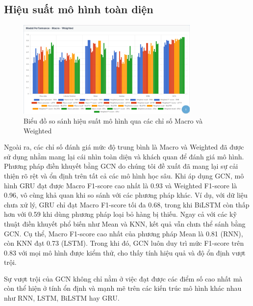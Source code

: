 \subsection{Hiệu suất mô hình toàn diện}
\begin{figure}[H]
    \centering
    \includegraphics[width = 0.8\textwidth]{imgs/demo-modelperf.png}
    \caption{Biểu đồ so sánh hiệu suất mô hình qua các chỉ số Macro và Weighted}
    \label{fig:demo-modelperf}
\end{figure}

Ngoài ra, các chỉ số đánh giá mức độ trung bình là Macro và Weighted đã được sử dụng nhằm mang lại cái nhìn toàn diện và khách quan để đánh giá mô hình. Phương pháp điền khuyết bằng GCN do chúng tôi đề xuất đã mang lại sự cải thiện rõ rệt và ổn định trên tất cả các mô hình học sâu. Khi áp dụng GCN, mô hình GRU đạt được Macro F1-score cao nhất là 0.93 và Weighted F1-score là 0.96, vô cùng khả quan khi so sánh với các phương pháp khác. Ví dụ, với dữ liệu chưa xử lý, GRU chỉ đạt Macro F1-score tối đa 0.68, trong khi BiLSTM còn thấp hơn với 0.59 khi dùng phương pháp loại bỏ hàng bị thiếu. Ngay cả với các kỹ thuật điền khuyết phổ biến như Mean và KNN, kết quả vẫn chưa thể sánh bằng GCN. Cụ thể, Macro F1-score cao nhất của phương pháp Mean là 0.81 (RNN), còn KNN đạt 0.73 (LSTM). Trong khi đó, GCN luôn duy trì mức F1-score trên 0.83 với mọi mô hình được kiểm thử, cho thấy tính hiệu quả và độ ổn định vượt trội.

Sự vượt trội của GCN không chỉ nằm ở việc đạt được các điểm số cao nhất mà còn thể hiện ở tính ổn định và mạnh mẽ trên các kiến trúc mô hình khác nhau như RNN, LSTM, BiLSTM hay GRU.


